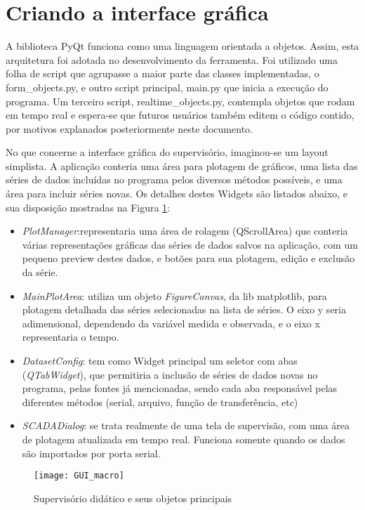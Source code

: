 \section{Criando a interface gráfica}

A biblioteca PyQt funciona como uma linguagem orientada a objetos. Assim, esta arquitetura foi adotada no desenvolvimento da ferramenta. Foi utilizado uma folha de script que agrupasse a maior parte das classes implementadas, o form\_objects.py, e outro script principal, main.py que inicia a execução do programa. Um terceiro script, realtime\_objects.py, contempla objetos que rodam em tempo real e espera-se que futuros usuários também editem o código contido, por motivos explanados posteriormente neste documento.

No que concerne a interface gráfica do supervisório, imaginou-se um layout simplista. A aplicação conteria uma área para plotagem de gráficos, uma lista das séries de dados incluídas no programa pelos diversos métodos possíveis, e uma área para incluir séries novas. Os detalhes destes Widgets são listados abaixo, e sua disposição mostradas na Figura \ref{img_gui_macro}:

\begin{itemize}
	\item \emph{PlotManager}:representaria uma área de rolagem (QScrollArea) que conteria várias representações gráficas das séries de dados salvos na aplicação, com um pequeno preview destes dados, e botões para sua plotagem, edição e exclusão da série.
	\item \emph{MainPlotArea}: utiliza um objeto \emph{FigureCanvas}, da lib matplotlib, para plotagem detalhada das séries selecionadas na lista de séries. O eixo y seria adimensional, dependendo da variável medida e observada, e o eixo x representaria o tempo.
	\item \emph{DatasetConfig}: tem como Widget principal um seletor com abas (\emph{QTabWidget}), que permitiria a inclusão de séries de dados novas no programa, pelas fontes já mencionadas, sendo cada aba responsável pelas diferentes métodos (serial, arquivo, função de transferência, etc)
	\item \emph{SCADADialog}: se trata realmente de uma tela de supervisão, com uma área de plotagem atualizada em tempo real. Funciona somente quando os dados são importados por porta serial.
\end{itemize}

\begin{figure}[hbt]
	\centering
	\texttt{[image: GUI\_macro]}
	\caption{Supervisório didático e seus objetos principais}
	\label{img_gui_macro}
\end{figure}

